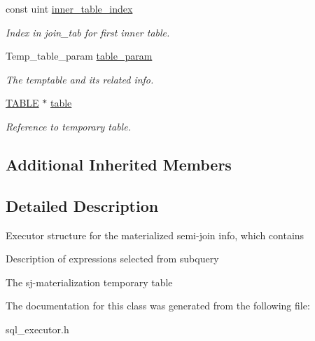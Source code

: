 \begin{DoxyCompactItemize}
const uint \mbox{\hyperlink{classSemijoin__mat__exec_a67e7548cf5367c2c2a3f5620849856cb}{inner\+\_\+table\+\_\+index}}
\begin{DoxyCompactList}\small\item\em Index in join\+\_\+tab for first inner table. \end{DoxyCompactList}\item 
\mbox{\label{classSemijoin__mat__exec_a8e9384a0d165798aeb131543382e050e}} 
Temp\+\_\+table\+\_\+param \mbox{\hyperlink{classSemijoin__mat__exec_a8e9384a0d165798aeb131543382e050e}{table\+\_\+param}}
\begin{DoxyCompactList}\small\item\em The temptable and its related info. \end{DoxyCompactList}\item 
\mbox{\label{classSemijoin__mat__exec_a46a4bcfd2a37db01420f050d6de6cf24}} 
\mbox{\hyperlink{structTABLE}{T\+A\+B\+LE}} $\ast$ \mbox{\hyperlink{classSemijoin__mat__exec_a46a4bcfd2a37db01420f050d6de6cf24}{table}}
\begin{DoxyCompactList}\small\item\em Reference to temporary table. \end{DoxyCompactList}\end{DoxyCompactItemize}
\subsection*{Additional Inherited Members}


\subsection{Detailed Description}
Executor structure for the materialized semi-\/join info, which contains
\begin{DoxyItemize}
\item Description of expressions selected from subquery
\item The sj-\/materialization temporary table 
\end{DoxyItemize}

The documentation for this class was generated from the following file\+:\begin{DoxyCompactItemize}
\item 
sql\+\_\+executor.\+h\end{DoxyCompactItemize}
